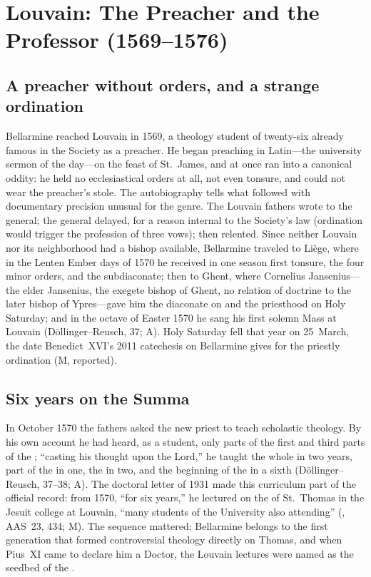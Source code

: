 \section{Louvain: The Preacher and the Professor (1569--1576)}

\subsection{A preacher without orders, and a strange ordination}

Bellarmine reached Louvain in 1569, a theology student of
twenty-six already famous in the Society as a preacher. He began
preaching in Latin---the university sermon of the day---on the feast
of St.~James, and at once ran into a canonical oddity: he held no
ecclesiastical orders at all, not even tonsure, and could not wear
the preacher's stole. The autobiography tells what followed with
documentary precision unusual for the genre. The Louvain fathers
wrote to the general; the general delayed, for a reason internal to
the Society's law (ordination would trigger the profession of three
vows); then relented. Since neither Louvain nor its neighborhood had
a bishop available, Bellarmine traveled to Li\`ege, where in the
Lenten Ember days of 1570 he received in one season first tonsure,
the four minor orders, and the subdiaconate; then to Ghent, where
Cornelius Jansenius---the elder Jansenius, the exegete bishop of
Ghent, no relation of doctrine to the later bishop of Ypres---gave
him the diaconate on  and the priesthood on
Holy Saturday; and in the octave of Easter 1570 he sang his first
solemn Mass at Louvain (D\"ollinger--Reusch, 37; A). Holy Saturday
fell that year on 25~March, the date Benedict~XVI's 2011 catechesis
on Bellarmine gives for the priestly ordination (M, reported).

\subsection{Six years on the Summa}

In October 1570 the fathers asked the new priest to teach scholastic
theology. By his own account he had heard, as a student, only parts
of the first and third parts of the ; ``casting his
thought upon the Lord,'' he taught the whole  in
two years, part of the  in one, the
 in two, and the beginning of the
 in a sixth (D\"ollinger--Reusch, 37--38; A). The
doctoral letter of 1931 made this curriculum part of the official
record: from 1570, ``for six years,'' he lectured on the
 of St.~Thomas in the Jesuit college at Louvain, ``many
students of the University also attending''
(, AAS~23, 434; M). The sequence
mattered: Bellarmine belongs to the first generation that formed
controversial theology directly on Thomas, and when Pius~XI came to
declare him a Doctor, the Louvain lectures were named as the seedbed
of the .

